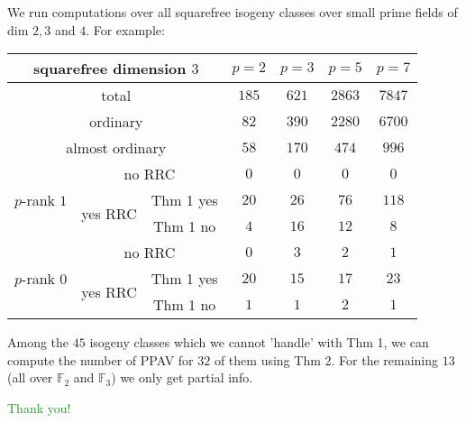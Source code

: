 \documentclass[usenames,dvipsnames,handout]{beamer}
\def\F{\mathbb{F}}
\newcommand{\green}[1]{\textcolor{ForestGreen}{#1}}
\begin{document}
\begin{frame}{ }
	We run computations over all squarefree isogeny classes over small prime fields of dim $2,3$ and $4$. 
	\pause For example:
	\begin{table}[ht]
	    \centering
	    \small
	    \begin{tabular}{|c|c|c|c|c|c|c|}\hline
	\multicolumn{3}{|c|}{squarefree dimension $3$}                  & $p=2$ & $p=3$ & $p=5$ & $p=7$ \\\hline
	\multicolumn{3}{|c|}{total}                                     & $185$ & $621$  & $2863$ & $7847$ \\\hline                    
	\multicolumn{3}{|c|}{ordinary}                                  & $82$ & $390$  & $2280$  & $6700$ \\\hline
	\multicolumn{3}{|c|}{almost ordinary}                           & $58$ & $170$  & $474$  & $996$  \\\hline
	\multirow{3}{*}{$p$-rank $1$} & \multicolumn{2}{|c|}{no RRC}    & $0$ & $0$   & $0$   & $0$   \\\cline{2-7}
	                              & \multirow{2}{*}{yes RRC} & Thm 1 yes & $20$ & $26$   & $76$   & $118$   \\\cline{3-7}
	                              &                          & Thm 1 no  & $4$ & $16$   & $12$   & $8$   \\\hline
	\multirow{3}{*}{$p$-rank $0$}   & \multicolumn{2}{|c|}{no RRC}    & $0$ & $3$   & $2$   & $1$   \\\cline{2-7}
	                              & \multirow{2}{*}{yes RRC} & Thm 1 yes & $20$ & $15$   & $17$   & $23$   \\\cline{3-7}
	                              &                          & Thm 1 no  & $1$ & $1$   & $2$   & $1$   \\\hline                              
	    \end{tabular}
	\end{table}
    \pause Among the $45$ isogeny classes which we cannot 'handle' with Thm 1, we can compute the number of PPAV for $32$ of them using Thm 2. For the remaining $13$ (all over $\F_2$ and $\F_3$) we only get partial info.
\end{frame}

\begin{frame}{ }
\begin{center}
\green{\huge Thank you!}
\end{center}
\end{frame}
\end{document}
